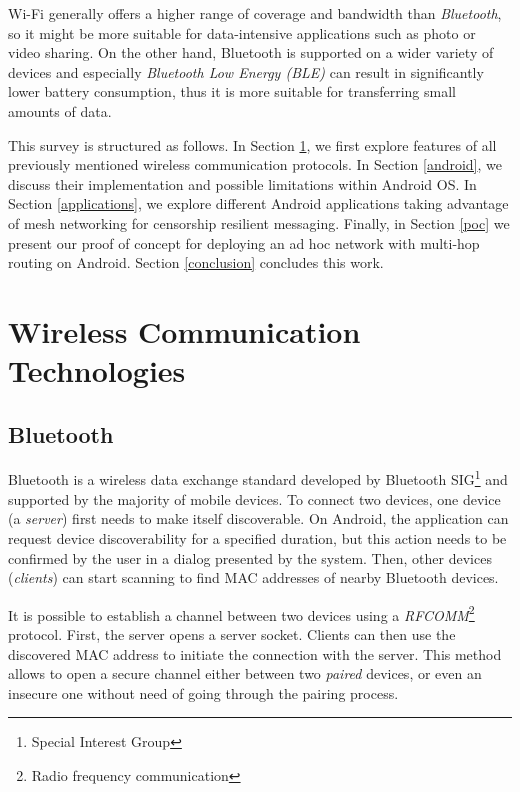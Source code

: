 \documentclass[conference,compsoc]{IEEEtran}
\begin{document}
Wi-Fi generally offers a higher range of coverage and bandwidth than \textit{Bluetooth}, so it might be more suitable for data-intensive applications such as photo or video sharing. On the other hand, Bluetooth is supported on a wider variety of devices and especially \textit{Bluetooth Low Energy (BLE)} \cite{android:ble} can result in significantly lower battery consumption, thus it is more suitable for transferring small amounts of data.

This survey is structured as follows. In Section \ref{wirelesstech}, we first explore features of all previously mentioned wireless communication protocols. In Section \ref{android}, we discuss their implementation and possible limitations within Android OS. In Section \ref{applications}, we explore different Android applications taking advantage of mesh networking for censorship resilient messaging. Finally, in Section \ref{poc} we present our proof of concept for deploying an ad hoc network with multi-hop routing on Android. Section \ref{conclusion} concludes this work.

\section{Wireless Communication Technologies} \label{wirelesstech}

\subsection{Bluetooth}
Bluetooth is a wireless data exchange standard developed by Bluetooth SIG\footnote{Special Interest Group} and supported by the majority of mobile devices. To connect two devices, one device
 (a \textit{server}) first needs to make itself discoverable. On Android, the application can request device discoverability for a specified duration, but this action needs to be confirmed by the user in a dialog presented by the system. Then, other devices (\textit{clients}) can start scanning to find MAC addresses of nearby Bluetooth devices.

It is possible to establish a channel between two devices using a \textit{RFCOMM}\footnote{Radio frequency communication} protocol. First, the server opens a server socket. Clients can then use the discovered MAC address to initiate the connection with the server. This method allows to open a secure channel either between two \textit{paired} devices, or even an insecure one without need of going through the pairing process.
\end{document}
